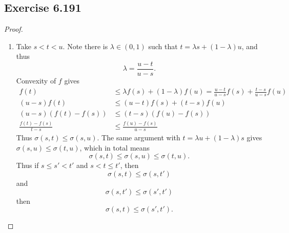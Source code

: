 \documentclass[hw_all.tex]{subfiles}
\begin{document}
\subsection{Exercise 6.191}
\begin{proof}
    \begin{enumerate}
        \item
            Take $s < t < u$. Note there is $\lambda \in (0,1)$ such that $t =  \lambda s + (1 - \lambda) u$, and thus
            \[
                \lambda = \frac{u - t}{u - s}
            .\]
            Convexity of $f$ gives
            \begin{align*}
                f(t) &\leq \lambda f(s) + (1-\lambda) f(u) = \frac{u-t}{u-s} f(s) + \frac{t-s}{u-s} f(u) \\
                (u-s) f(t) &\leq (u-t) f(s) + (t-s) f(u) \\
                (u-s) (f(t) - f(s)) &\leq (t-s) (f(u) - f(s)) \\
                \frac{f(t) - f(s)}{t - s} &\leq \frac{f(u) - f(s)}{u - s}
            \end{align*}
            Thus $\sigma(s,t) \leq \sigma(s,u)$. The same argument with $t = \lambda u + (1 - \lambda) s$ gives $\sigma(s,u) \leq \sigma(t,u)$, which in total means
            \[
                \sigma(s,t) \leq \sigma(s,u) \leq \sigma(t, u)
            .\]
            Thus if $s \leq s' < t'$ and $s < t \leq t'$, then
            \[
                \sigma(s,t) \leq \sigma(s, t')
            \]
            and
            \[
                \sigma(s,t') \leq \sigma(s', t')
            \]
            then
            \[
                \sigma(s,t) \leq \sigma(s',t')
            .\]


\end{enumerate}
\end{proof}
\end{document}

